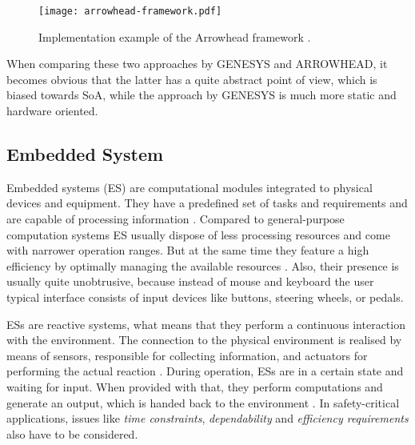 \begin{figure}[!htbp]
\centering
\texttt{[image: arrowhead-framework.pdf]}
\caption{Implementation example of the Arrowhead framework \cite{arrowhead:presentation}.}
\label{fig:arrowhead-framework}
\end{figure}

When comparing these two approaches by GENESYS and ARROWHEAD, it becomes obvious that the latter has a quite abstract point of view, which is biased towards SoA, while the approach by GENESYS is much more static and hardware oriented.



\subsection{Embedded System}
\label{sec:embedded_system}

Embedded systems (ES) are computational modules integrated to physical devices and equipment. They have a predefined set of tasks and requirements and are capable of processing information \cite{rodrigues2011} \cite[p.xiii]{marwedel}. Compared to general-purpose computation systems ES usually dispose of less processing resources and come with narrower operation ranges. But at the same time they feature a high efficiency by optimally managing the available resources \cite[p.283]{alippi} \cite[p.5]{marwedel}. Also, their presence is usually quite unobtrusive, because instead of mouse and keyboard the user typical interface consists of input devices like buttons, steering wheels, or pedals.

ESs are reactive systems, what means that they perform a continuous interaction with the environment. The connection to the physical environment is realised by means of sensors, responsible for collecting information, and actuators for performing the actual reaction \cite[p.8-9]{marwedel}. During operation, ESs are in a certain state and waiting for input. When provided with that, they perform computations and generate an output, which is handed back to the environment \cite[p.9]{marwedel}. In safety-critical applications, issues like \emph{time constraints}, \emph{dependability} and \emph{efficiency requirements} also have to be considered.

